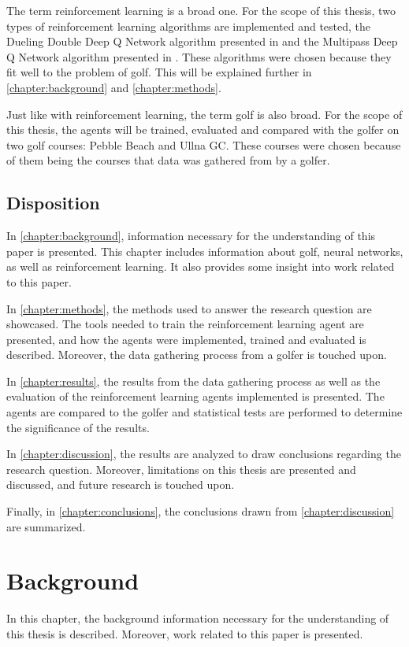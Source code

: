 \documentclass{kththesis}
\begin{document}
The term reinforcement learning is a broad one. For the scope of this thesis, two types of reinforcement learning algorithms are implemented and tested, the Dueling Double Deep Q Network algorithm presented in \textcite{wang2015dueling} and the Multipass Deep Q Network algorithm presented in \textcite{bester2019mpdqn}. These algorithms were chosen because they fit well to the problem of golf. This will be explained further in \autoref{chapter:background} and \autoref{chapter:methods}.

Just like with reinforcement learning, the term golf is also broad. For the scope of this thesis, the agents will be trained, evaluated and compared with the golfer on two golf courses: Pebble Beach and Ullna GC. These courses were chosen because of them being the courses that data was gathered from by a golfer. 

\section{Disposition}
In \autoref{chapter:background}, information necessary for the understanding of this paper is presented. This chapter includes information about golf, neural networks, as well as reinforcement learning. It also provides some insight into work related to this paper.

In \autoref{chapter:methods}, the methods used to answer the research question are showcased. The tools needed to train the reinforcement learning agent are presented, and how the agents were implemented, trained and evaluated is described. Moreover, the data gathering process from a golfer is touched upon.

In \autoref{chapter:results}, the results from the data gathering process as well as the evaluation of the reinforcement learning agents implemented is presented. The agents are compared to the golfer and statistical tests are performed to determine the significance of the results. 

In \autoref{chapter:discussion}, the results are analyzed to draw conclusions regarding the research question. Moreover, limitations on this thesis are presented and discussed, and future research is touched upon.

Finally, in \autoref{chapter:conclusions}, the conclusions drawn from \autoref{chapter:discussion} are summarized.

\chapter{Background}
\label{chapter:background}
In this chapter, the background information necessary for the understanding of this thesis is described. Moreover, work related to this paper is presented.
\end{document}

